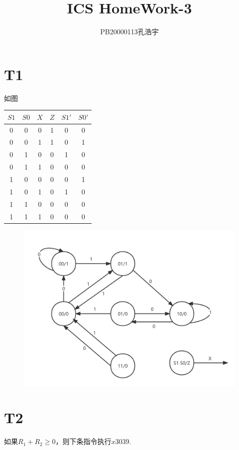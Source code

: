 \documentclass{article}
\title{ICS  HomeWork-3}
\author{PB20000113孔浩宇}
\begin{document}
\maketitle
\section*{T1}如图
    \begin{table}[!ht]
        \centering
        \begin{tabular}{|c|c|c|c|c|c|}
        \hline
            $S1$ & $S0$ & $X$ & $Z$ & $S1'$ & $S0'$ \\ \hline
            0 & 0 & 0 & 1 & 0 & 0  \\ \hline
            0 & 0 & 1 & 1 & 0 & 1  \\ \hline
            0 & 1 & 0 & 0 & 1 & 0  \\ \hline
            0 & 1 & 1 & 0 & 0 & 0  \\ \hline
            1 & 0 & 0 & 0 & 0 & 1  \\ \hline
            1 & 0 & 1 & 0 & 1 & 0  \\ \hline
            1 & 1 & 0 & 0 & 0 & 0  \\ \hline
            1 & 1 & 1 & 0 & 0 & 0  \\ \hline
        \end{tabular}
    \end{table}
    \begin{figure}[htbp]
        \centering
        \includegraphics[scale=0.15]{T1.png}
    \end{figure}
\section*{T2}
    如果$R_1+R_2 \geq 0$，则下条指令执行$x3039$.
\end{document}
